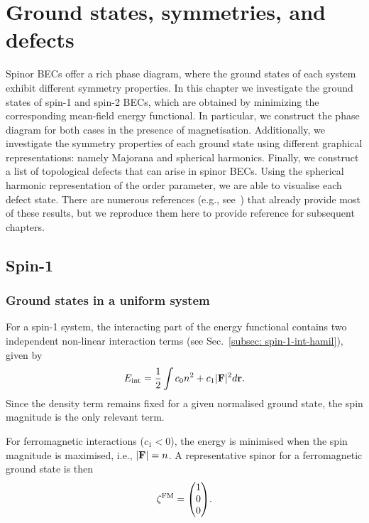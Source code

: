 \chapter{Ground states, symmetries, and defects}\label{chap: ground-states}
Spinor BECs offer a rich phase diagram, where the ground states of each system
exhibit different symmetry properties.
In this chapter we investigate the ground states of spin-1 and spin-2 BECs,
which are obtained by minimizing the corresponding mean-field energy functional.
In particular, we construct the phase diagram for both cases in the presence
of magnetisation.
Additionally, we investigate the symmetry properties of each ground state
using different graphical representations: namely Majorana and spherical
harmonics.
Finally, we construct a list of topological defects that can arise in spinor
BECs.
Using the spherical harmonic representation of the order parameter, we are able
to visualise each defect state.
There are numerous references (e.g., see~\cite{Ciobanu2000, Zhang2003,
Kawaguchi2012,Stamper-Kurn2013}) that already provide most of these results,
but we reproduce them here to provide reference for subsequent chapters.


\section{Spin-1}\label{sec: ground-states-spin-1}

\subsection{Ground states in a uniform system}

For a spin-1 system, the interacting part of the energy functional contains
two independent non-linear interaction terms (see
Sec.~\ref{subsec: spin-1-int-hamil}), given by
\begin{equation}
    E_\mathrm{int} = \frac{1}{2}\int c_0n^2+c_1|\vb{F}|^2 d\vb{r}.
\end{equation}
Since the density term remains fixed for a given normalised ground state, the
spin magnitude is the only relevant term.

For ferromagnetic interactions (\(c_1 < 0 \)), the energy is minimised when
the spin magnitude is maximised, i.e., \(|\vb{F}| = n\).
A representative spinor for a ferromagnetic ground state is then
\begin{equation}
    \zeta^\mathrm{FM} = \mqty(1 \\ 0 \\ 0).
\end{equation}

